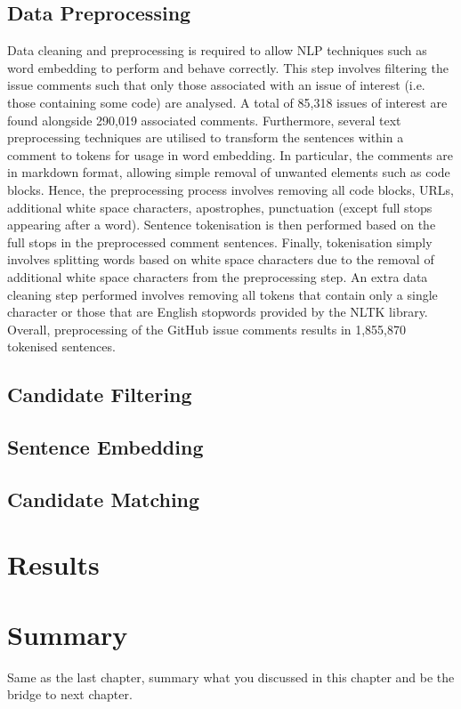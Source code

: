 
\subsection{Data Preprocessing}
\label{subsec:info-data-preprocess}
Data cleaning and preprocessing is required to allow NLP techniques such as word embedding to perform and behave correctly. This step involves filtering the issue comments such that only those associated with an issue of interest (i.e. those containing some code) are analysed. A total of 85,318 issues of interest are found alongside 290,019 associated comments.
Furthermore, several text preprocessing techniques are utilised to transform the sentences within a comment to tokens for usage in word embedding. In particular, the comments are in markdown format, allowing simple removal of unwanted elements such as code blocks. Hence, the preprocessing process involves removing all code blocks, URLs, additional white space characters, apostrophes, punctuation (except full stops appearing after a word).  Sentence tokenisation is then performed based on the full stops in the preprocessed comment sentences. Finally, tokenisation simply involves splitting words based on white space characters due to the removal of additional white space characters from the preprocessing step. An extra data cleaning step performed involves removing all tokens that contain only a single character or those that are English stopwords provided by the NLTK library. Overall, preprocessing of the GitHub issue comments results in 1,855,870 tokenised sentences.

\subsection{Candidate Filtering}
\label{subsec:info-candidate-filtering}

\subsection{Sentence Embedding}
\label{subsec:info-sentence-embedding}

\subsection{Candidate Matching}
\label{subsec:info-candidate-match}

\section{Results}
\label{sec:info-results}

\section{Summary}
Same as the last chapter, summary what you discussed in this chapter and
be the bridge to next chapter.
